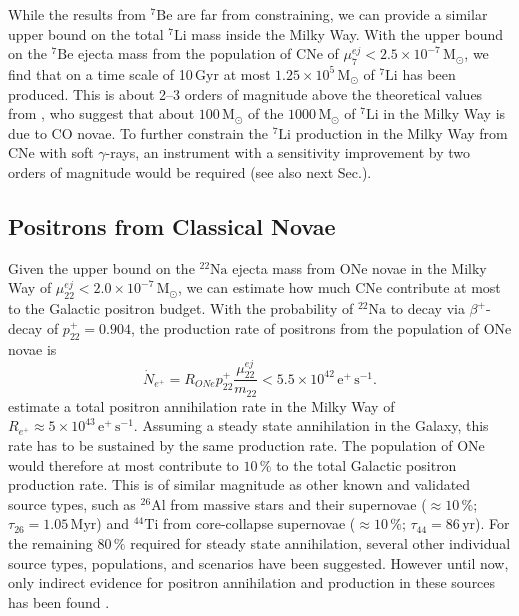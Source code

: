 \documentclass{aa}
\newcommand{\mrm}[1]{\mathrm{#1}}
\newcommand{\nuc}[2]{$\mrm{^{#2}#1}$}
\begin{document}
While the results from \nuc{Be}{7} are far from constraining, we can provide a similar upper bound on the total \nuc{Li}{7} mass inside the Milky Way.
%
With the upper bound on the \nuc{Be}{7} ejecta mass from the population of CNe of $\mu_{7}^{ej} < 2.5 \times 10^{-7}\,\mrm{M_{\odot}}$, we find that on a time scale of 10\,Gyr at most $1.25 \times 10^5\,\mrm{M_{\odot}}$ of \nuc{Li}{7} has been produced.
%
This is about 2--3 orders of magnitude above the theoretical values from \citet{Starrfield2020_COnovae}, who suggest that about $100\,\mrm{M_{\odot}}$ of the $1000\,\mrm{M_{\odot}}$ of \nuc{Li}{7} in the Milky Way is due to CO novae.
%
To further constrain the \nuc{Li}{7} production in the Milky Way from CNe with soft $\gamma$-rays, an instrument with a sensitivity improvement by two orders of magnitude would be required (see also next Sec.).


\subsection{Positrons from Classical Novae}\label{sec:positron_production}
%
Given the upper bound on the \nuc{Na}{22} ejecta mass from ONe novae in the Milky Way of $\mu_{22}^{ej} < 2.0 \times 10^{-7}\,\mrm{M_{\odot}}$, we can estimate how much CNe contribute at most to the Galactic positron budget.
%
With the probability of \nuc{Na}{22} to decay via $\beta^+$-decay of $p_{22}^+ = 0.904$, the production rate of positrons from the population of ONe novae is
%
\begin{equation}
	\dot{N}_{e^+} = R_{ONe} p_{22}^+ \frac{\mu_{22}^{ej}}{m_{22}} < 5.5 \times 10^{42}\,\mrm{e^+\,s^{-1}.}
	\label{eq:positron_production}
\end{equation}
%
\citet{Siegert2016_511} estimate a total positron annihilation rate in the Milky Way of $R_{e^+} \approx 5 \times 10^{43}\,\mrm{e^+\,s^{-1}}$.
%
Assuming a steady state annihilation in the Galaxy, this rate has to be sustained by the same production rate.
%
The population of ONe would therefore at most contribute to $10\,\%$ to the total Galactic positron production rate.
%
This is of similar magnitude as other known and validated source types, such as \nuc{Al}{26} from massive stars and their supernovae ($\approx 10\,\%$; $\tau_{26} = 1.05\,\mrm{Myr}$) and \nuc{Ti}{44} from core-collapse supernovae ($\approx 10\,\%$; $\tau_{44} = 86\,\mrm{yr}$).
%
For the remaining $80\,\%$ required for steady state annihilation, several other individual source types, populations, and scenarios have been suggested.
%
However until now, only indirect evidence for positron annihilation and production in these sources has been found \citep[cf.][for a review]{Prantzos2011_511}.
\end{document}

